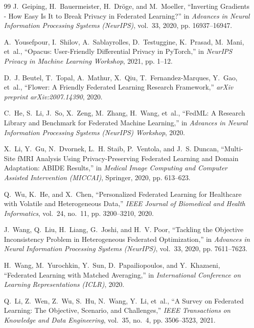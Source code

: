\documentclass[12pt,a4paper]{report}
\begin{document}
\begin{thebibliography}{99}
J.~Geiping, H.~Bauermeister, H.~Dr{\"o}ge, and M.~Moeller,
``Inverting Gradients - How Easy Is It to Break Privacy in Federated Learning?''
in \emph{Advances in Neural Information Processing Systems (NeurIPS)}, vol.~33, 2020, pp. 16937--16947.

A.~Yousefpour, I.~Shilov, A.~Sablayrolles, D.~Testuggine, K.~Prasad, M.~Mani, et~al.,
``Opacus: User-Friendly Differential Privacy in PyTorch,''
in \emph{NeurIPS Privacy in Machine Learning Workshop}, 2021, pp. 1--12.

D.~J. Beutel, T.~Topal, A.~Mathur, X.~Qiu, T.~Fernandez-Marques, Y.~Gao, et~al.,
``Flower: A Friendly Federated Learning Research Framework,''
\emph{arXiv preprint arXiv:2007.14390}, 2020.

C.~He, S.~Li, J.~So, X.~Zeng, M.~Zhang, H.~Wang, et~al.,
``FedML: A Research Library and Benchmark for Federated Machine Learning,''
in \emph{Advances in Neural Information Processing Systems (NeurIPS) Workshop}, 2020.

X.~Li, Y.~Gu, N.~Dvornek, L.~H. Staib, P.~Ventola, and J.~S. Duncan,
``Multi-Site fMRI Analysis Using Privacy-Preserving Federated Learning and Domain Adaptation: ABIDE Results,''
in \emph{Medical Image Computing and Computer Assisted Intervention (MICCAI)}, Springer, 2020, pp. 613--623.

Q.~Wu, K.~He, and X.~Chen,
``Personalized Federated Learning for Healthcare with Volatile and Heterogeneous Data,''
\emph{IEEE Journal of Biomedical and Health Informatics}, vol.~24, no.~11, pp. 3200--3210, 2020.

J.~Wang, Q.~Liu, H.~Liang, G.~Joshi, and H.~V. Poor,
``Tackling the Objective Inconsistency Problem in Heterogeneous Federated Optimization,''
in \emph{Advances in Neural Information Processing Systems (NeurIPS)}, vol.~33, 2020, pp. 7611--7623.

H.~Wang, M.~Yurochkin, Y.~Sun, D.~Papailiopoulos, and Y.~Khazaeni,
``Federated Learning with Matched Averaging,''
in \emph{International Conference on Learning Representations (ICLR)}, 2020.

Q.~Li, Z.~Wen, Z.~Wu, S.~Hu, N.~Wang, Y.~Li, et~al.,
``A Survey on Federated Learning: The Objective, Scenario, and Challenges,''
\emph{IEEE Transactions on Knowledge and Data Engineering}, vol.~35, no.~4, pp. 3506--3523, 2021.


\end{thebibliography}
\end{document}

